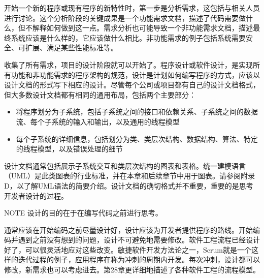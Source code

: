 开始一个新的程序或现有程序的新特性时，第一步是分析需求，这包括与相关人员进行讨论。这个分析阶段的关键成果是一个功能需求文档，描述了代码需要做什么，但不解释如何做到这一点。需求分析也可能导致一个非功能需求文档，描述最终系统应该是什么样的，它应该做什么相比。非功能需求的例子包括系统需要安全、可扩展、满足某些性能标准等。

收集了所有需求，项目的设计阶段就可以开始了。程序设计或软件设计，是实现所有功能和非功能需求的程序架构的规范，设计是计划如何编写程序的方式，应该以设计文档的形式写下相应的设计。尽管每个公司或项目都有自己的设计文档格式，但大多数设计文档都有相同的通用布局，包括两个主要部分：

\begin{itemize}
\item
将程序划分为子系统，包括子系统之间的接口和依赖关系、子系统之间的数据流、每个子系统的输入和输出，以及通用的线程模型

\item
每个子系统的详细信息，包括划分为类、类层次结构、数据结构、算法、特定的线程模型，以及错误处理的细节
\end{itemize}

设计文档通常包括展示子系统交互和类层次结构的图表和表格。统一建模语言（UML）是此类图表的行业标准，并在本章和后续章节中用于图表。请参阅附录D，以了解UML语法的简要介绍。设计文档的确切格式并不重要，重要的是思考开发者设计的过程。

\begin{myNotic}{NOTE}
设计的目的在于在编写代码之前进行思考。
\end{myNotic}

通常应该在开始编码之前尽量设计好，设计应该为开发者提供程序的路线。开始编码并遇到之前没有想到的问题，设计不可避免地需要修改。软件工程流程已经设计好了，可以很灵活地应对这些改变。敏捷软件开发方法论之一，Scrum就是一个这样的迭代过程的例子，应用程序在称为冲刺的周期内开发。每次冲刺，设计都可以修改，新需求也可以考虑进去。第28章更详细地描述了各种软件工程的流程模型。































